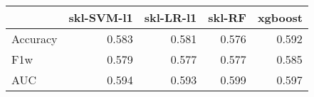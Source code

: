 \begin{tabular}{lrrrr}
\toprule
{} &  skl-SVM-l1 &  skl-LR-l1 &  skl-RF &  xgboost \\
\midrule
Accuracy &       0.583 &      0.581 &   0.576 &    0.592 \\
F1w      &       0.579 &      0.577 &   0.577 &    0.585 \\
AUC      &       0.594 &      0.593 &   0.599 &    0.597 \\
\bottomrule
\end{tabular}
